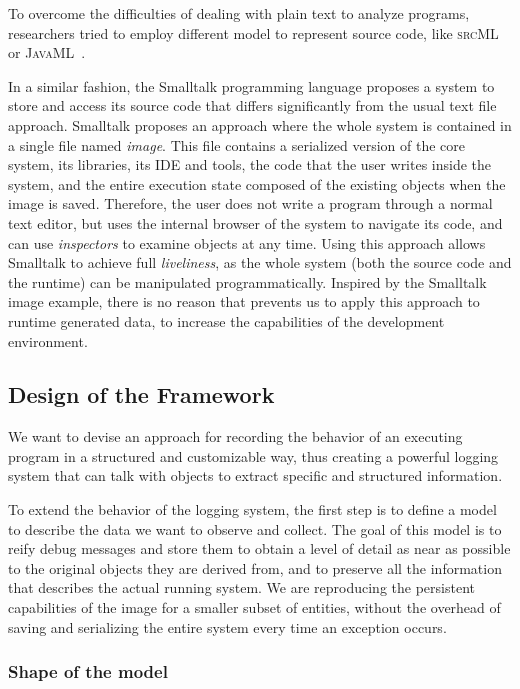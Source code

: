 To overcome the difficulties of dealing with plain text to analyze programs, researchers tried to employ different model to represent source code, like \textsc{srcML}~\cite{Male2002a} or \textsc{JavaML}~\cite{Badr2000}.

In a similar fashion, the Smalltalk programming language proposes a system to store and access its source code that differs significantly from the usual text file approach.
Smalltalk proposes an approach where the whole system is contained in a single file named {\em image}.
This file contains a serialized version of the core system, its libraries, its IDE and tools, the code that the user writes inside the system, and the entire execution state composed of the existing objects when the image is saved.
Therefore, the user does not write a program through a normal text editor, but uses the internal browser of the system to navigate its code, and can use \emph{inspectors} to examine objects at any time.
Using this approach allows Smalltalk to achieve full \emph{liveliness}, as the whole system (both the source code and the runtime) can be manipulated programmatically.
Inspired by the Smalltalk image example, there is no reason that prevents us to apply this approach to runtime generated data, to increase the capabilities of the development environment.

\subsection{Design of the Framework}\label{sec:reified-design}

We want to devise an approach for recording the behavior of an executing program in a structured and customizable way, thus creating a powerful logging system that can talk with objects to extract specific and structured information.

To extend the behavior of the logging system, the first step is to define a model to describe the data we want to observe and collect.
The goal of this model is to reify debug messages and store them to obtain a level of detail as near as possible to the original objects they are derived from, and to preserve all the information that describes the actual running system.
We are reproducing the persistent capabilities of the \pha image for a smaller subset of entities, without the overhead of saving and serializing the entire system every time an exception occurs.

\subsubsection{Shape of the model}

